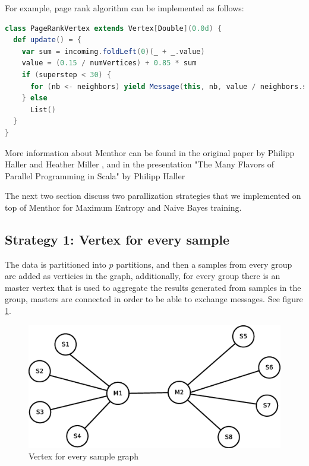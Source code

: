 \documentclass{report}
\begin{document}
For example, page rank algorithm can be implemented as follows:

\begin{lstlisting}[language=scala, caption={Page rank algorithm}, label={listing:pagerank}]
class PageRankVertex extends Vertex[Double](0.0d) {
  def update() = {
    var sum = incoming.foldLeft(0)(_ + _.value)
    value = (0.15 / numVertices) + 0.85 * sum
    if (superstep < 30) {
      for (nb <- neighbors) yield Message(this, nb, value / neighbors.size)
    } else
      List()
  }
}
\end{lstlisting}

More information about Menthor can be found in the original paper by Philipp Haller and Heather Miller \cite{oai:infoscience.epfl.ch:165111}, and in the presentation "The Many Flavors of Parallel Programming in Scala" by Philipp Haller \cite{scalaparallel}

The next two section discuss two parallization strategies that we implemented on top of Menthor for Maximum Entropy and Naive Bayes training.

\subsection{Strategy 1: Vertex for every sample}

The data is partitioned into $p$ partitions, and then a samples from every group are added as verticies in the graph, additionally, for every group there is an master vertex that is used to aggregate the results generated from samples in the group, masters are connected in order to be able to exchange messages. See figure \ref{fig:vs:graph1}.

\begin{figure}[!htb]
  \centering
  \includegraphics*[scale=0.45]{graph1.eps}
  \caption{Vertex for every sample graph}
  \label{fig:vs:graph1}
\end{figure}
\end{document}
